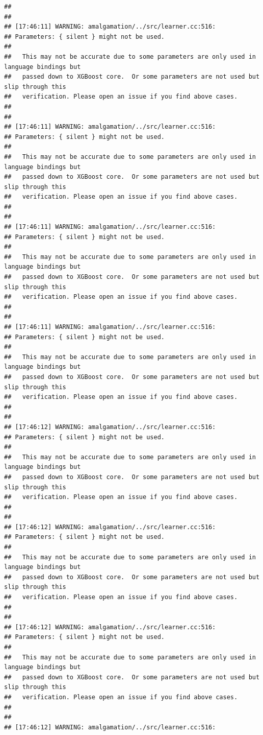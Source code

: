 \documentclass[AMS,STIX2COL]{WileyNJD-v2}\usepackage[]{graphicx}\usepackage[]{color}
\makeatletter
\newenvironment{kframe}{%
 \def\at@end@of@kframe{}%
 \ifinner\ifhmode%
  \def\at@end@of@kframe{\end{minipage}}%
  \begin{minipage}{\columnwidth}%
 \fi\fi%
 \def\FrameCommand##1{\hskip\@totalleftmargin \hskip-\fboxsep
 \colorbox{shadecolor}{##1}\hskip-\fboxsep
     \hskip-\linewidth \hskip-\@totalleftmargin \hskip\columnwidth}%
 \MakeFramed {\advance\hsize-\width
   \@totalleftmargin\z@ \linewidth\hsize
   \@setminipage}}%
 {\par\unskip\endMakeFramed%
 \at@end@of@kframe}
\newenvironment{knitrout}{}{} %
\makeatother
\begin{document}
\begin{knitrout}
\begin{kframe}
\begin{verbatim}
## 
## 
## [17:46:11] WARNING: amalgamation/../src/learner.cc:516: 
## Parameters: { silent } might not be used.
## 
##   This may not be accurate due to some parameters are only used in language bindings but
##   passed down to XGBoost core.  Or some parameters are not used but slip through this
##   verification. Please open an issue if you find above cases.
## 
## 
## [17:46:11] WARNING: amalgamation/../src/learner.cc:516: 
## Parameters: { silent } might not be used.
## 
##   This may not be accurate due to some parameters are only used in language bindings but
##   passed down to XGBoost core.  Or some parameters are not used but slip through this
##   verification. Please open an issue if you find above cases.
## 
## 
## [17:46:11] WARNING: amalgamation/../src/learner.cc:516: 
## Parameters: { silent } might not be used.
## 
##   This may not be accurate due to some parameters are only used in language bindings but
##   passed down to XGBoost core.  Or some parameters are not used but slip through this
##   verification. Please open an issue if you find above cases.
## 
## 
## [17:46:11] WARNING: amalgamation/../src/learner.cc:516: 
## Parameters: { silent } might not be used.
## 
##   This may not be accurate due to some parameters are only used in language bindings but
##   passed down to XGBoost core.  Or some parameters are not used but slip through this
##   verification. Please open an issue if you find above cases.
## 
## 
## [17:46:12] WARNING: amalgamation/../src/learner.cc:516: 
## Parameters: { silent } might not be used.
## 
##   This may not be accurate due to some parameters are only used in language bindings but
##   passed down to XGBoost core.  Or some parameters are not used but slip through this
##   verification. Please open an issue if you find above cases.
## 
## 
## [17:46:12] WARNING: amalgamation/../src/learner.cc:516: 
## Parameters: { silent } might not be used.
## 
##   This may not be accurate due to some parameters are only used in language bindings but
##   passed down to XGBoost core.  Or some parameters are not used but slip through this
##   verification. Please open an issue if you find above cases.
## 
## 
## [17:46:12] WARNING: amalgamation/../src/learner.cc:516: 
## Parameters: { silent } might not be used.
## 
##   This may not be accurate due to some parameters are only used in language bindings but
##   passed down to XGBoost core.  Or some parameters are not used but slip through this
##   verification. Please open an issue if you find above cases.
## 
## 
## [17:46:12] WARNING: amalgamation/../src/learner.cc:516: 

\end{verbatim}
\end{kframe}
\end{knitrout}
\end{document}
